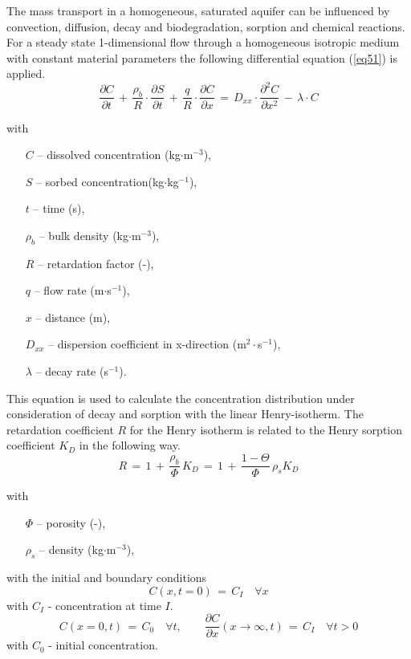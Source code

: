 
The mass transport in a homogeneous, saturated aquifer can be influenced by convection, diffusion, decay and biodegradation, sorption and chemical reactions. For a steady state 1-dimensional flow through a homogeneous isotropic medium with constant material parameters the following differential equation (\ref{eq51}) is applied.
%
\begin{equation}
\frac{\partial C}{\partial t}\,+\, \frac{\rho_b}{R}\cdot\frac{\partial S}{\partial t}\,+\, \frac{q}{R}\cdot\frac{\partial C}{\partial x}\,=\,
D_{xx}\cdot\frac{\partial^2C}{\partial x^2}\,-\,\lambda\cdot C
\label{eq51}
\end{equation}
{\small
with
\begin{itemize}
\item[$C$] -- dissolved concentration (kg$\cdot$m$^{-3}$),
\item[$S$] -- sorbed concentration(kg$\cdot$kg$^{-1}$),
\item[$t$] -- time (s),
\item[$\rho_b$] -- bulk density (kg$\cdot$m$^{-3}$),
\item[$R$] -- retardation factor (-),
\item[$q$] -- flow rate (m$\cdot$s$^{-1}$),
\item[$x$] -- distance (m),
\item[$D_{xx}$] -- dispersion coefficient in x-direction (m$^2\cdot$s$^{-1}$),
\item[$\lambda$] -- decay rate (s$^{-1}$).
\end{itemize}
}

This equation is used to calculate the concentration distribution under consideration of decay and sorption with the linear Henry-isotherm. The retardation coefficient $R$ for the Henry isotherm is related to the Henry sorption coefficient $K_D$ in the following way.
%
\begin{equation}
R\,=\,1\,+\,\frac{\rho_b}{\Phi}\,K_D\,=\,
1\,+\,\frac{1-\Theta}{\Phi}\,\rho_s K_D
\label{eq52}
\end{equation}
{\small
with
\begin{itemize}
\item[$\Phi$] -- porosity (-),
\item[$\rho_s$] -- density (kg$\cdot$m$^{-3}$),
\end{itemize}
with the initial and boundary conditions
\begin{displaymath}
C(x,t=0)\,=\,C_I\quad\forall x
\end{displaymath}
with $C_I$ - concentration at time $I$.
\begin{displaymath}
C(x=0,t)\,=\,C_0\quad\forall t,\qquad
\frac{\partial C}{\partial x}(x\rightarrow\infty,t)\,=\,C_I
\quad\forall t>0
\end{displaymath}
with $C_0$ - initial concentration.
}

